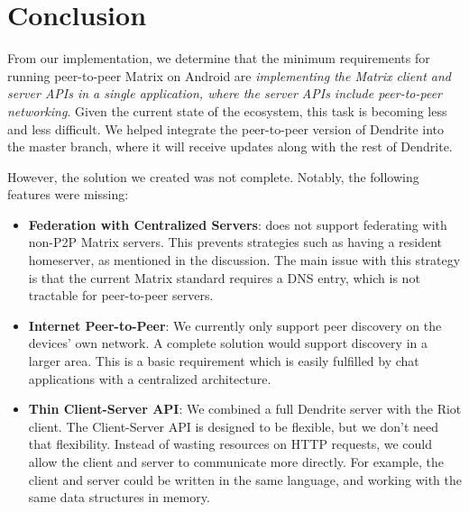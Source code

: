 \chapter{Conclusion}

From our implementation, we determine that the minimum requirements for running peer-to-peer Matrix on Android are \textit{implementing the Matrix client and server \ac{API}s in a single application, where the server \ac{API}s include peer-to-peer networking}.
Given the current state of the ecosystem, this task is becoming less and less difficult.
We helped integrate the peer-to-peer version of Dendrite into the master branch, where it will receive updates along with the rest of Dendrite.

However, the solution we created was not complete.
Notably, the following features were missing:
\begin{itemize}
	\item{
	      \textbf{Federation with Centralized Servers}:
	       does not support federating with non-P2P Matrix servers.
	      This prevents strategies such as having a resident homeserver, as mentioned in the discussion.
	      The main issue with this strategy is that the current Matrix standard requires a DNS entry, which is not tractable for peer-to-peer servers.
	      }
	\item{
	      \textbf{Internet Peer-to-Peer}:
	      We currently only support peer discovery on the devices' own network.
	      A complete solution would support discovery in a larger area.
	      This is a basic requirement which is easily fulfilled by chat applications with a centralized architecture.
	      }
	\item{
	      \textbf{Thin Client-Server API}:
	      We combined a full Dendrite server with the Riot client.
	      The Client-Server API is designed to be flexible, but we don't need that flexibility.
	      Instead of wasting resources on HTTP requests, we could allow the client and server to communicate more directly.
	      For example, the client and server could be written in the same language, and working with the same data structures in memory.
	      }
\end{itemize}